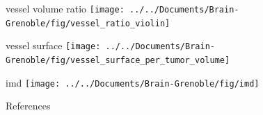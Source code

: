 \documentclass[draft,caption=numbered]{beamer}
\begin{document}
\begin{frame}{vessel volume ratio}
    \centering
    \texttt{[image: ../../Documents/Brain-Grenoble/fig/vessel\_ratio\_violin]}
\end{frame}

\begin{frame}{vessel surface}
    \centering
    \texttt{[image: ../../Documents/Brain-Grenoble/fig/vessel\_surface\_per\_tumor\_volume]}
\end{frame}

\begin{frame}{imd}
    \centering
    \texttt{[image: ../../Documents/Brain-Grenoble/fig/imd]}
\end{frame}

\begin{frame}{References}
    \renewcommand*{\bibfont}{\tiny}
    \printbibliography
\end{frame}
\end{document}

